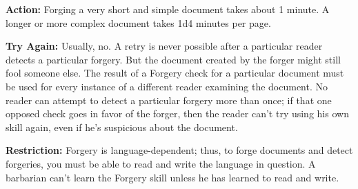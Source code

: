 \textbf{Action:} Forging a very short and simple document takes about 1 minute. 
A longer or more complex document takes 1d4 minutes per page.

\textbf{Try Again:} Usually, no. A retry is never possible after a particular reader detects a particular forgery. But the document created by the forger might still fool someone else. The result of a Forgery check for a particular document must be used for every instance of a different reader examining the document. No reader can attempt to detect a particular forgery more than once; if that one opposed check goes in favor of the forger, then the reader can't try using his own skill again, even if he's suspicious about the document.

\textbf{Restriction:} Forgery is language-dependent; thus, to forge documents and detect forgeries, you must be able to read and write the language in question. A barbarian can't learn the Forgery skill unless he has learned to read and write.
